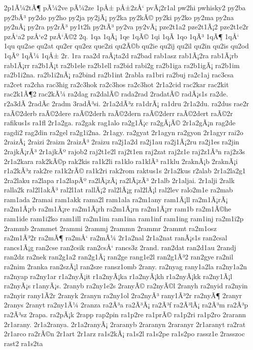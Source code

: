 {2p1Ã¼2tÃ¶
pÃ¼2ve
pÃ¼2ze
1pÅ±
pÅ±2zÅ‘
pvÃ¡2r1al
pw2hi
pwhisky2
py2ba
py2bÃ³
py2do
py2ho
py2ja
py2jÃ¡
py2ka
py2kÃ©
py2ki
py2ko
py2ma
py2na
py2nÃ¡
py2ra
py2rÃ³
py1t2h
py2tÃ³
py2va
py2vÃ¡
pze2t1a2
pze2t1Ã¡2
pze2t1e2r
pzÅ‘a2
pzÅ‘e2
pzÅ‘Ã©2
2q.
1qa
1qÃ¡
1qe
1qÃ©
1qi
1qÃ­
1qo
1qÃ³
1qÃ¶
1qÅ‘
1qu
qu2ae
qu2at
qu2er
qu2ez
que2zi
qu2Ã©b
qu2ie
qu2ij
qu2il
qu2in
qu2is
qu2od
1qÃº
1qÃ¼
1qÅ±
2r.
1ra
raa2d
raÃ¡ta2d
ra2bad
rab1asz
rab1Ã¡2ra
rab1Ã¡rb
rab1Ã¡rr
ra2b1Ã¡t
ra2b1ele
ra2b1ell
ra2bid
rabi2g
ra2b1iga
ra2b1igÃ¡
ra2b1im
ra2b1i2na.
ra2b1i2nÃ¡
ra2bind
ra2b1int
2rabla
ra1bri
ra2buj
ra2c1aj
rac3csa
ra2cet
ra2cha
rac3hig
ra2c3hok
ra2c3hos
ra2c3hot
2r1a2cid
rac2kar
rac2kit
rac2k1Ã¶2
rac2kÃ¼
ra2dag
ra2dalÃ©
rada2rad
2radatÃ©
radÃ¡s1s
ra2de.
r2a3dÃ­
2radÃ­c
2radm
3radÃ³si.
2r1a2dÃ³z
ra1drÃ¡
ra1dru
2r1a2du.
ra2dus
rae2r
raÃ©2derb
raÃ©2dere
raÃ©2derh
raÃ©2dern
raÃ©2derr
raÃ©2dert
raÃ©2r
rafikus1s
ra1fl
2r1a2ga.
ra2gak
rag1alo
ra2g1Ã¡c
ra2gÃ¡Ã©
2r1a2gÃ¡n
rag2de
ragdi2
rag2din
ra2gel
ra2g1i2na.
2r1agy.
ra2gyat
2r1agyn
ra2gyon
2r1agyr
rai2o
2raizÃ¡
2raizi
2raizn
2raizÃ³
2raizu
ra2j1a2d
ra2j1au
ra2j1Ã¡2ru
ra2j1es
ra2jin
2rajkÃ¡rÃ³
2r1ajkÃº
rajob2
raj2t1e2l
raj2t1en
raj2zat
raj2z1e
raj2z1Ã³n
raj2z3s
2r1a2kara
rak2kÃ©p
rak2kis
ra1k2li
ra1klo
ra1klÃ³
ra1klu
2raknÃ¡b
2raknÃ¡i
r1a2kÃ³z
rak2re
ra1k2rÃ©
ra1k2ri
rak2rom
raktus1s
2r1a2kus
r2alab
2r1a2la2g1
2ra2laku
ra2lapa
r1a2lapÃº
ra2lÃ¡zÃ¡
ra2lÃ¡zÃ³
2r1alb
2r1aljai.
2r1alji
2ralk
ralla2k
ral2l1akÃ³
ral2l1at
rallÃ¡2
ral2lÃ¡g
ral2lÃ¡l
ral2lev
ralo2m1e
ra2mab
ram1ada
2ramai
ram1akk
rama2l
ram1ala
ra2m1any
ram1Ã¡ll
ra2m1Ã¡rÃ¡
ra2m1Ã¡rb
ra2m1Ã¡re
ra2m1Ã¡rh
ra2m1Ã¡rn
ra2m1Ã¡rr
ram1b
ra2m1Ã©he
ram1ide
ram1i2ko
ram1ill
ra2m1im
ram1ina
ram1inf
ram1ing
ram1inj
ra2m1i2p
2rammb
2rammet
2rammi
2rammj
2rammn
2rammr
2rammt
ra2m1osz
ra2m1Ã³2r
ra2mÃ¶
ra2mÅ‘
ra2mÃ¼
2r1a2nal
2r1a2nat
ranÃ¡s1s
ran2csal
rancs1Ã¡g
ran2cse
ran2csik
ran2csÅ‘
rancs3z
2rand.
ran2dat
ran2d1au
2randj
ran2dz
ra2nek
ran2g1a2
ran2g1Ã¡
ran2ge
rang1e2l
ran2g1Ã³2
ran2gye
ra2nil
ra2nim
2ranka
ran2szÃ¡l
ran2sze
ransz1omb
2rany.
ra2nyag
rany1a2la
ra2ny1a2n
ra2nyap
ra2ny1ar
r1a2nyÃ¡it
r1a2nyÃ¡ka
r1a2nyÃ¡kh
r1a2nyÃ¡kk
ra2ny1Ã¡l
ra2nyÃ¡s
r1anyÃ¡s.
2ranyb
ra2ny1e2s
2ranyÃ©
ra2nyÃ©l
2ranyh
ra2nyid
ra2nyin
ra2nyir
rany1Ã­2r
2ranyk
2ranyn
ra2ny1ol
2ra2nyÃ³
rany1Ã³2r
ra2nyÃ¶
2ranyr
2ranys
2ranyt
ra2ny1Ã¼
2ranza
ra2Ã³a
ra2Ã³Ã¡
ra2Ã³f
ra2Ã³lÃ¡
ra2Ã³m
ra2Ã³p
ra2Ã³sz
2rapa.
ra2pÃ¡k
2rapp
rap2pin
ra1p2re
ra1prÃ©
ra1p2ri
ra1p2ro
2rarann
2r1arany.
2r1a2ranya.
2r1a2ranyÃ¡
2raranyb
2raranyn
2raranyr
2r1aranyt
ra2rat
2r1arco
ra2rÃ©n
2r1art
2r1arz
ra1s2kÃ¡
ra1s2l
ra1s2pe
ra1s2po
rassz1e
2rasszoc
rast2
ra1s2ta
}
